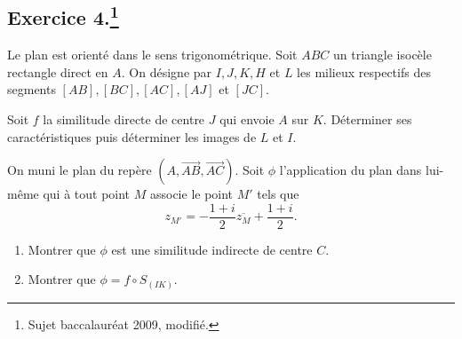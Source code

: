 \documentclass[a4paper]{article}
\begin{document}
\subsection*{Exercice 4.\footnote{Sujet baccalauréat 2009, modifié.}}
Le plan est orienté dans le sens trigonométrique. Soit $ABC$ un triangle isocèle rectangle direct en $A$. On désigne par $I, J, K, H$ et $L$ les milieux respectifs des segments $[AB], [BC], [AC], [AJ]$ et $[JC]$.
\begin{enumerate}
	\item Soit $f$ la similitude directe de centre $J$ qui envoie $A$ sur $K$. Déterminer ses caractéristiques puis déterminer les images de $L$ et $I$.

\begin{minipage}{0.5\textwidth}
	\item On muni le plan du repère $(A,\overrightarrow{AB},\overrightarrow{AC})$. Soit $\phi$ l'application du plan dans lui-même qui à tout point $M$ associe le point $M'$ tels que \[
			z_{M'}=-\frac{1+i}{2} \overline{z_M}+\frac{1+i}{2}
	.\] 
	\begin{enumerate}
		\item Montrer que $\phi$ est une similitude indirecte de centre $C$.
		\item Montrer que $\phi=f\circ S_{(IK)}$.
	\end{enumerate}
\end{minipage}%
\begin{minipage}{0.5\textwidth}
	\centering
{}
\end{minipage}
\end{enumerate}
\end{document}
